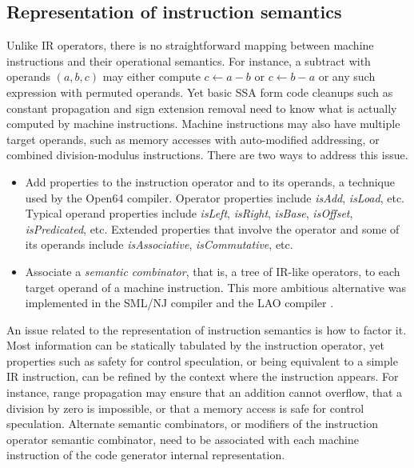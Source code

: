 
\subsection{Representation of instruction semantics}

Unlike IR operators, there is no straightforward mapping between machine
instructions and their operational semantics. For instance, a subtract with
operands $(a,b,c)$ may either compute $c \leftarrow a-b$ or $c \leftarrow b-a$
or any such expression with permuted operands. Yet basic SSA form code cleanups
such as constant propagation and sign extension removal need to know what is
actually computed by machine instructions.  Machine instructions may also have
multiple target operands, such as memory accesses with auto-modified addressing,
or combined division-modulus instructions.  There are two ways to address this
issue. \begin{itemize} \item Add properties to the instruction operator and to
its operands, a technique used by the Open64 compiler. Operator properties
include \emph{isAdd}, \emph{isLoad}, etc. Typical operand properties include
\emph{isLeft}, \emph{isRight}, \emph{isBase}, \emph{isOffset},
\emph{isPredicated}, etc. Extended properties that involve the operator and some
of its operands include \emph{isAssociative}, \emph{isCommutative}, etc.  \item
Associate a \emph{semantic combinator}, that is, a tree of IR-like operators, to
each target operand of a machine instruction. This more ambitious alternative
was implemented in the SML/NJ \cite{Leung:1999:PLDI} compiler and the LAO
compiler \cite{Dinechin:2000:CASES}.  \end{itemize}

An issue related to the representation of instruction semantics is how to factor
it. Most information can be statically tabulated by the instruction operator,
yet properties such as safety for control speculation, or being equivalent to a
simple IR instruction, can be refined by the context where the instruction
appears. For instance, range propagation may ensure that an addition cannot
overflow, that a division by zero is impossible, or that a memory access is safe
for control speculation.  Alternate semantic combinators, or modifiers of the
instruction operator semantic combinator, need to be associated with each
machine instruction of the code generator internal representation.

